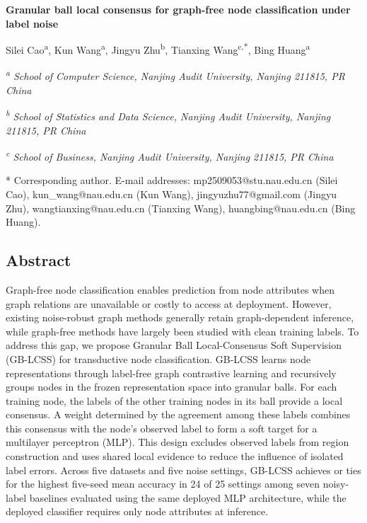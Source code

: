 \textbf{Granular ball local consensus for graph-free node classification under label noise}

Silei Cao\textsuperscript{a}, Kun Wang\textsuperscript{a}, Jingyu Zhu\textsuperscript{b}, Tianxing Wang\textsuperscript{c,*}, Bing Huang\textsuperscript{a}

\emph{\textsuperscript{a} School of Computer Science, Nanjing Audit University, Nanjing 211815, PR China}

\emph{\textsuperscript{b} School of Statistics and Data Science, Nanjing Audit University, Nanjing 211815, PR China}

\emph{\textsuperscript{c} School of Business, Nanjing Audit University, Nanjing 211815, PR China}

* Corresponding author. E-mail addresses: mp2509053@stu.nau.edu.cn (Silei Cao), kun\_wang@nau.edu.cn (Kun Wang), jingyuzhu77@gmail.com (Jingyu Zhu), wangtianxing@nau.edu.cn (Tianxing Wang), huangbing@nau.edu.cn (Bing Huang).

\subsection{Abstract}\label{abstract}

Graph-free node classification enables prediction from node attributes when graph relations are unavailable or costly to access at deployment. However, existing noise-robust graph methods generally retain graph-dependent inference, while graph-free methods have largely been studied with clean training labels. To address this gap, we propose Granular Ball Local-Consensus Soft Supervision (GB-LCSS) for transductive node classification. GB-LCSS learns node representations through label-free graph contrastive learning and recursively groups nodes in the frozen representation space into granular balls. For each training node, the labels of the other training nodes in its ball provide a local consensus. A weight determined by the agreement among these labels combines this consensus with the node's observed label to form a soft target for a multilayer perceptron (MLP). This design excludes observed labels from region construction and uses shared local evidence to reduce the influence of isolated label errors. Across five datasets and five noise settings, GB-LCSS achieves or ties for the highest five-seed mean accuracy in 24 of 25 settings among seven noisy-label baselines evaluated using the same deployed MLP architecture, while the deployed classifier requires only node attributes at inference.

